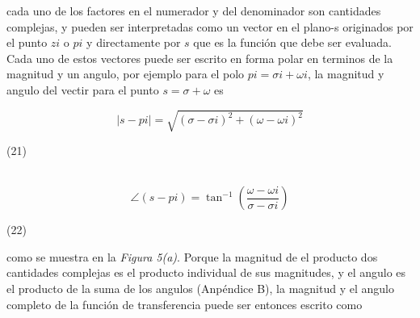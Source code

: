 \documentclass[10pt,a4paper]{article}
\begin{document}
cada uno de los factores en el numerador y del denominador son cantidades complejas, y pueden ser interpretadas como un vector en el plano-s originados por el punto $z{\scriptscriptstyle i}$ o $p{\scriptscriptstyle i}$ y directamente por $s$ que es la función que debe ser evaluada. Cada uno de estos vectores puede ser escrito en forma polar en terminos de la magnitud y un angulo, por ejemplo para el polo $p{\scriptscriptstyle i}=\sigma{\scriptscriptstyle i} + \omega{\scriptscriptstyle i}$, la magnitud y angulo del vectir para el punto $s=\sigma + \omega$ es
\begin{center}
  \[|s-p{\scriptscriptstyle i}|=\sqrt{(\sigma-\sigma{\scriptscriptstyle i})^2+(\omega-\omega{\scriptscriptstyle i})^2}\]
  \begin{minipage}{0.9\textwidth}
    \begin{flushright}
        (21)
    \end{flushright}
  \end{minipage}
  \\
  \[\angle (s-p{\scriptscriptstyle i}) = \tan^{-1}\left(\frac{\omega-\omega{\scriptscriptstyle i}}{\sigma-\sigma{\scriptscriptstyle i}}\right)\]
  \begin{minipage}{0.9\textwidth}
    \begin{flushright}
        (22)
    \end{flushright}
  \end{minipage}
\end{center}

como se muestra en la \textit{Figura 5(a)}. Porque la magnitud de el producto dos cantidades complejas es el producto individual de sus magnitudes, y el angulo es el producto de la suma de los angulos (Anpéndice B), la magnitud y el angulo completo de la función de transferencia puede ser entonces escrito como
\end{document}
